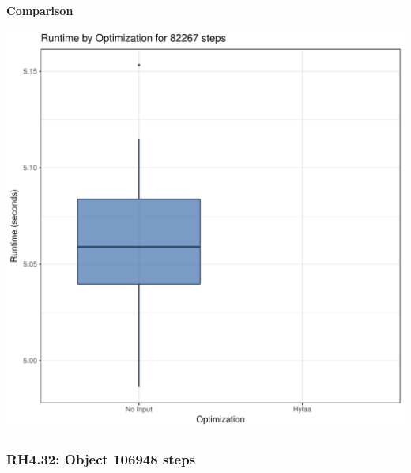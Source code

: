 \documentclass{article}\usepackage[]{graphicx}\usepackage[]{color}
\makeatletter
\def\maxwidth{ %
  \ifdim\Gin@nat@width>\linewidth
    \linewidth
  \else
    \Gin@nat@width
  \fi
}
\newenvironment{knitrout}{}{} %
\makeatother
\begin{document}
 \textbf{Comparison}
  
\begin{knitrout}
\color{fgcolor}
\includegraphics[width=\maxwidth]{figure/RH4_steps82267-1} 

\end{knitrout}


\subsubsection{RH4.32: Object 106948 steps}
\end{document}
